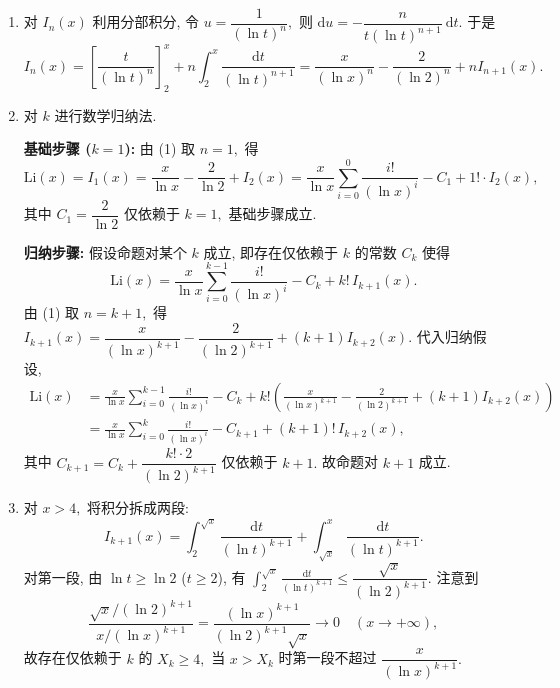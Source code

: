 \begin{solution}
\begin{enumerate}
\item 对 $I_n(x)$ 利用分部积分, 令 $u = \dfrac{1}{(\ln t)^n},$ 则 $\mathrm{d}u = -\dfrac{n}{t(\ln t)^{n+1}} ~ \mathrm{d}t.$ 于是
\begin{equation*}
I_n(x) = \left[ \frac{t}{(\ln t)^n} \right]_2^x + n \int_2^x \frac{\mathrm{d}t}{(\ln t)^{n+1}} = \frac{x}{(\ln x)^n} - \frac{2}{(\ln 2)^n} + n I_{n+1}(x).
\end{equation*}

\item 对 $k$ 进行数学归纳法.

\textbf{基础步骤 ($k = 1$):} 由 (1) 取 $n = 1,$ 得
\begin{equation*}
\mathrm{Li}(x) = I_1(x) = \frac{x}{\ln x} - \frac{2}{\ln 2} + I_2(x) = \frac{x}{\ln x} \sum_{i=0}^{0} \frac{i!}{(\ln x)^i} - C_1 + 1! \cdot I_2(x),
\end{equation*}
其中 $C_1 = \dfrac{2}{\ln 2}$ 仅依赖于 $k = 1,$ 基础步骤成立.

\textbf{归纳步骤:} 假设命题对某个 $k$ 成立, 即存在仅依赖于 $k$ 的常数 $C_k$ 使得
\begin{equation*}
\mathrm{Li}(x) = \frac{x}{\ln x} \sum_{i=0}^{k-1} \frac{i!}{(\ln x)^i} - C_k + k! \, I_{k+1}(x).
\end{equation*}
由 (1) 取 $n = k+1,$ 得 $I_{k+1}(x) = \dfrac{x}{(\ln x)^{k+1}} - \dfrac{2}{(\ln 2)^{k+1}} + (k+1) I_{k+2}(x).$ 代入归纳假设,
\begin{align*}
\mathrm{Li}(x)
&= \frac{x}{\ln x} \sum_{i=0}^{k-1} \frac{i!}{(\ln x)^i} - C_k + k! \left( \frac{x}{(\ln x)^{k+1}} - \frac{2}{(\ln 2)^{k+1}} + (k+1) I_{k+2}(x) \right) \\
&= \frac{x}{\ln x} \sum_{i=0}^{k} \frac{i!}{(\ln x)^i} - C_{k+1} + (k+1)! \, I_{k+2}(x),
\end{align*}
其中 $C_{k+1} = C_k + \dfrac{k! \cdot 2}{(\ln 2)^{k+1}}$ 仅依赖于 $k+1.$ 故命题对 $k+1$ 成立.

\item 对 $x > 4,$ 将积分拆成两段:
\begin{equation*}
I_{k+1}(x) = \int_2^{\sqrt{x}} \frac{\mathrm{d}t}{(\ln t)^{k+1}} + \int_{\sqrt{x}}^{x} \frac{\mathrm{d}t}{(\ln t)^{k+1}}.
\end{equation*}
对第一段, 由 $\ln t \ge \ln 2$ ($t \ge 2$), 有 $\displaystyle\int_2^{\sqrt{x}} \frac{\mathrm{d}t}{(\ln t)^{k+1}} \le \dfrac{\sqrt{x}}{(\ln 2)^{k+1}}.$ 注意到
\begin{equation*}
\frac{\sqrt{x}/(\ln 2)^{k+1}}{x / (\ln x)^{k+1}} = \frac{(\ln x)^{k+1}}{(\ln 2)^{k+1} \sqrt{x}} \to 0 \quad (x \to +\infty),
\end{equation*}
故存在仅依赖于 $k$ 的 $X_k \ge 4,$ 当 $x > X_k$ 时第一段不超过 $\dfrac{x}{(\ln x)^{k+1}}.$


\end{enumerate}
\end{solution}
